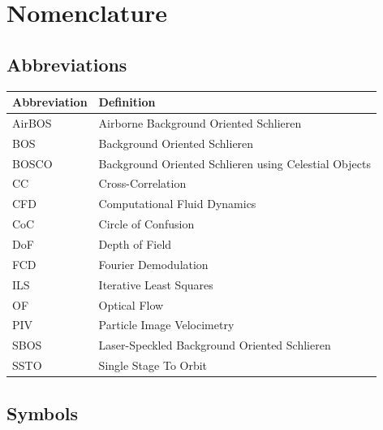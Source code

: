 \chapter*{Nomenclature}

\section*{Abbreviations}

\begin{longtable}{p{2.5cm}p{8cm}}
    \toprule
    Abbreviation & Definition \\
    \midrule\endhead %
    AirBOS & Airborne Background Oriented Schlieren \\
    BOS & Background Oriented Schlieren \\
    BOSCO & Background Oriented Schlieren using Celestial Objects \\
    CC & Cross-Correlation \\
    CFD & Computational Fluid Dynamics \\
    CoC & Circle of Confusion \\
    DoF & Depth of Field \\
    FCD & Fourier Demodulation \\
    ILS & Iterative Least Squares \\
    OF & Optical Flow \\
    PIV & Particle Image Velocimetry \\
    SBOS & Laser-Speckled Background Oriented Schlieren \\
    SSTO & Single Stage To Orbit \\
    \bottomrule
\end{longtable}

\section*{Symbols}


